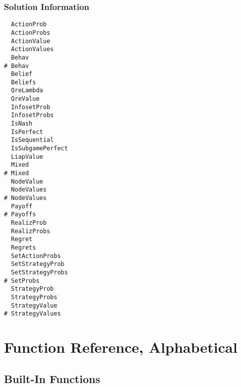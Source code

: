 \subsection{Solution Information}

\begin{multicols}{3}
\begin{verbatim}
  ActionProb 
  ActionProbs 
  ActionValue 
  ActionValues 
  Behav 
# Behav 
  Belief 
  Beliefs 
  QreLambda 
  QreValue 
  InfosetProb 
  InfosetProbs 
  IsNash 
  IsPerfect 
  IsSequential 
  IsSubgamePerfect 
  LiapValue 
  Mixed
# Mixed
  NodeValue 
  NodeValues 
# NodeValues 
  Payoff 
# Payoffs 
  RealizProb 
  RealizProbs 
  Regret
  Regrets
  SetActionProbs 
  SetStrategyProb 
  SetStrategyProbs 
# SetProbs
  StrategyProb 
  StrategyProbs
  StrategyValue 
# StrategyValues 
\end{verbatim}
\end{multicols}

\chapter{Function Reference, Alphabetical}
\pagestyle{lexicon}

\section{Built-In Functions}

